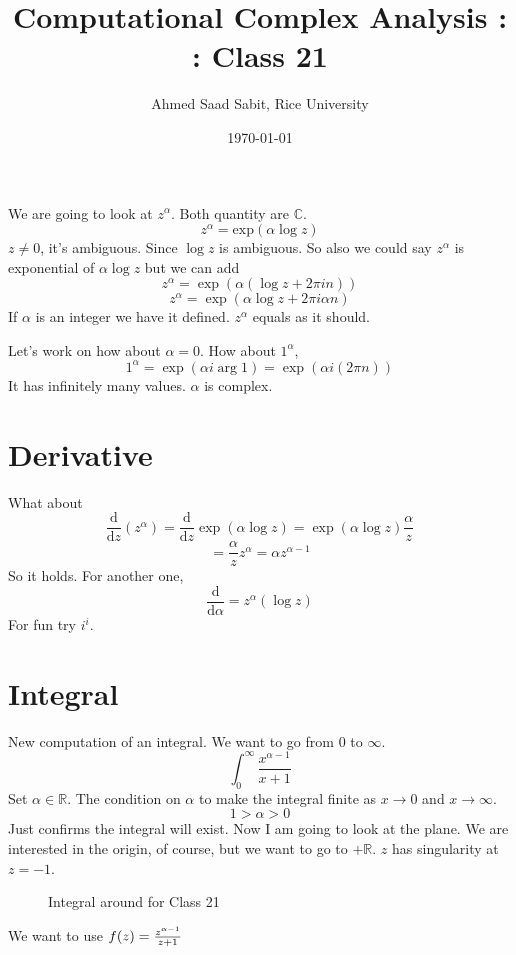 \documentclass[letter]{article}
\title{Computational Complex Analysis : : Class 21}
\author{Ahmed Saad Sabit, Rice University}
\date{\today}
\begin{document}
\maketitle

We are going to look at $z^{\alpha}$.
Both quantity are $\mathbb{C}$. 
\[
z^{\alpha}=
\text{exp}(\alpha \log z)
\] 
\nt{
\[
= \exp \left(
\alpha \left(
\ln |z| + i \arg z 
\right)
\right) = \exp \left(\alpha \ln |z| \right) \exp \left(i \alpha \arg z\right)
\] 
}
$z \neq 0$, it's ambiguous. Since $\log z$ is
ambiguous. So also we could say $z^{\alpha}$ is 
exponential of $\alpha \log z$ but we can add
\[
z^{\alpha} = 
\exp
\left(
\alpha 
\left(\log z + 2 \pi i n\right)
\right)
\] 
\[
z^{\alpha} = 
\exp
\left(\alpha \log z + 2 \pi i \alpha n\right)
\] 
If $\alpha $ is an integer we have it defined. $z^{\alpha}$ equals as it should. 


Let's work on how about $\alpha = 0$. How about $1 ^{\alpha}$, 
\[
1^{\alpha} = \exp \left(\alpha i \arg 1\right) = \exp (\alpha i \left(2 \pi n \right) )
\]
It has infinitely many values. $\alpha$ is complex.


\section*{Derivative}
What about
\[
\frac{\mathrm{d} }{\mathrm{d}  z} \left(z^{\alpha}\right) = 
\frac{\mathrm{d} }{\mathrm{d} z} \exp\left(\alpha \log z\right) = 
\exp \left(\alpha \log z\right) \frac{\alpha}{z}
\]
\[
= \frac{\alpha}{z}z^{\alpha} = \alpha z^{\alpha - 1}
\] 
So it holds. For another one, 
\[
\frac{\mathrm{d} }{\mathrm{d} \alpha} = z^{\alpha} \left(\log z\right)
\]
For fun try $i^{i}$. 

\section*{Integral} 
New computation of an integral. We want to go from $0$ to $\infty.$
 \[
\int_0^{\infty} \frac{x^{\alpha - 1}}{x + 1}
\] 
Set $\alpha \in \mathbb{R}$. 
The condition on $\alpha$ to make the integral finite 
as $x\to 0$ and $x\to \infty$. 
\[
1 > \alpha > 0 
\] 
Just confirms the integral will exist. Now I am going to look at the plane. 
We are interested in the origin, of course, but we want to go to $+ \mathbb{R}$. 
$z$ has singularity at $z = -1$. 
\begin{figure}[ht]
    \centering
    \caption{Integral around for Class 21}
    \label{fig:integral-around-for-class-21}
\end{figure}
We want to use $f(z) = {z^{\alpha - 1} \over z + 1}$
\end{document}
